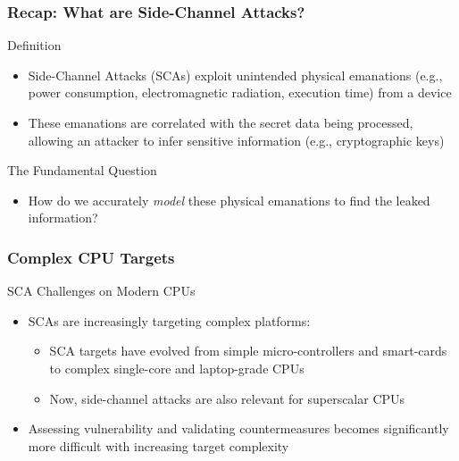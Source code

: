 \begin{frame}
    \frametitle{Recap: What are Side-Channel Attacks?}
    \begin{block}{Definition}
        \begin{itemize}
            \item Side-Channel Attacks (SCAs) exploit unintended physical emanations (e.g., power consumption, electromagnetic radiation, execution time) from a device
            \item These emanations are correlated with the secret data being processed, allowing an attacker to infer sensitive information (e.g., cryptographic keys)
        \end{itemize}
    \end{block}

    \begin{block}{The Fundamental Question }
        \begin{itemize}
            \item How do we accurately \textit{model} these physical emanations to find the leaked information?
        \end{itemize}
    \end{block}
\end{frame}
\begin{frame}
    \frametitle{Complex CPU Targets}
    \begin{block}{SCA Challenges on Modern CPUs}
    \begin{itemize}
        \item SCAs are increasingly targeting complex platforms:
            \begin{itemize}
                \item SCA targets have evolved from simple micro-controllers and smart-cards to complex single-core and laptop-grade CPUs
                \item Now, side-channel attacks are also relevant for superscalar CPUs
            \end{itemize}
        \item Assessing vulnerability and validating countermeasures becomes significantly more difficult with increasing target complexity
    \end{itemize}
    \end{block}
\end{frame}




